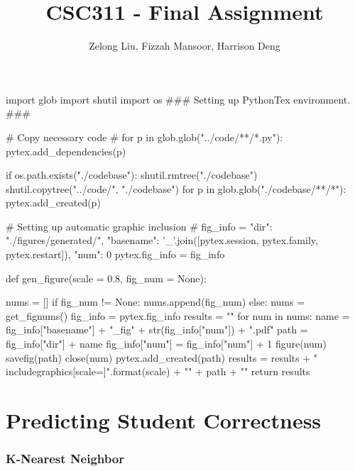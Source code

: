 \documentclass{article}
\title{CSC311 - Final Assignment}
\author{Zelong Liu, Fizzah Mansoor, Harrison Deng}
\begin{document}
    \begin{pylabcode}
        import glob
        import shutil
        import os
        ### Setting up PythonTex environment. ###

        # Copy necessary code #
        for p in glob.glob("../code/**/*.py"):
            pytex.add_dependencies(p)
        
        if os.path.exists("./codebase"):
            shutil.rmtree("./codebase")
        shutil.copytree("../code/", "./codebase")
        for p in glob.glob("./codebase/**/*"):
            pytex.add_created(p)

        # Setting up automatic graphic inclusion #
        fig_info = {
            "dir": "./figures/generated/",
            "basename": '_'.join([pytex.session, pytex.family, pytex.restart]),
            "num": 0
        }
        pytex.fig_info = fig_info

        def gen_figure(scale = 0.8, fig_num = None):

            nums = []
            if fig_num != None:
                nums.append(fig_num)
            else:
                nums = get_fignums()
            fig_info = pytex.fig_info
            results = ""
            for num in nums:
                name = fig_info["basename"] + "_fig" + str(fig_info["num"]) + ".pdf"
                path = fig_info["dir"] + name
                fig_info["num"] = fig_info["num"] + 1
                figure(num)
                savefig(path)
                close(num)
                pytex.add_created(path)
                results = results + "\\includegraphics[scale={}]".format(scale) + "{" + path + "}\n\n"
            return results
    \end{pylabcode}


    \maketitle

    \pagebreak

    \tableofcontents

    \pagebreak
    
    \part{Predicting Student Correctness}
    
    \section{K-Nearest Neighbor}
\end{document}
